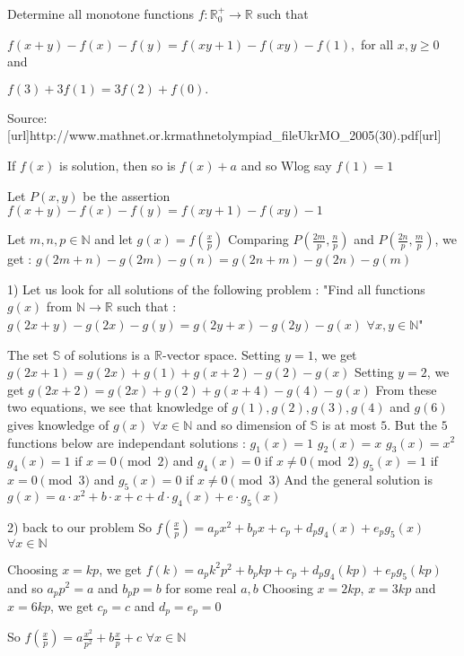 \begin{solution}
	\begin{tcolorbox}Determine all monotone functions $f:\mathbb{R}_0^+ \rightarrow \mathbb{R}$ such that 

$\displaystyle  f(x+y)-f(x)-f(y)=f(xy+1)-f(xy)-f(1),$ for all $x,y \geq 0$ and 

$f(3)+3f(1)=3f(2)+f(0).$



Source: [url]http://www.mathnet.or.kr\/mathnet\/olympiad_file\/UkrMO_2005(30).pdf[\/url]\end{tcolorbox}
If $f(x)$ is solution, then so is $f(x)+a$ and so Wlog say $f(1)=1$ 

Let $P(x,y)$ be the assertion $f(x+y)-f(x)-f(y)=f(xy+1)-f(xy)-1$

Let $m,n,p\in\mathbb N$  and let $g(x)=f(\frac xp)$
Comparing $P(\frac {2m}p,\frac np)$ and $P(\frac {2n}p,\frac mp)$, we get :
$g(2m+n)-g(2m)-g(n)=g(2n+m)-g(2n)-g(m)$

1) Let us look for all solutions of the following problem :
"Find all functions $ g(x)$ from $ \mathbb N\to\mathbb R$ such that : $ g(2x + y) - g(2x) - g(y) = g(2y + x) - g(2y) - g(x)$ $ \forall x,y\in\mathbb N$"

The set $ \mathbb S$ of solutions is a $ \mathbb R$-vector space.
Setting $ y = 1$, we get $ g(2x + 1) = g(2x) + g(1) + g(x + 2) - g(2) - g(x)$
Setting $ y = 2$, we get $ g(2x + 2) = g(2x) + g(2) + g(x + 4) - g(4) - g(x)$
From these two equations, we see that knowledge of $ g(1),g(2),g(3),g(4)$ and $ g(6)$ gives knowledge of $ g(x)$ $ \forall x\in\mathbb N$ and so dimension of $ \mathbb S$ is at most $ 5$.
But the $ 5$ functions below are independant solutions :
$ g_1(x) = 1$
$ g_2(x) = x$
$ g_3(x) = x^2$
$ g_4(x) = 1$ if $ x = 0\pmod 2$ and $ g_4(x) = 0$ if $ x\neq 0\pmod 2$
$ g_5(x) = 1$ if $ x = 0\pmod 3$ and $ g_5(x) = 0$ if $ x\neq 0\pmod 3$
And the general solution is $ g(x) = a\cdot x^2 + b\cdot x + c + d\cdot g_4(x) + e\cdot g_5(x)$

2) back to our problem
So $f(\frac xp)=a_px^2+b_px+c_p+d_pg_4(x)+e_pg_5(x)$ $\forall x\in\mathbb N$

Choosing $x=kp$, we get $f(k)=a_pk^2p^2+b_pkp+c_p+d_pg_4(kp)+e_pg_5(kp)$ and so $a_pp^2=a$ and $b_pp=b$ for some real $a,b$
Choosing $x=2kp$, $x=3kp$ and $x=6kp$, we get $c_p=c$ and $d_p=e_p=0$

So $f(\frac xp)=a\frac {x^2}{p^2}+b\frac xp+c$ $\forall x\in\mathbb N$


\end{solution}
